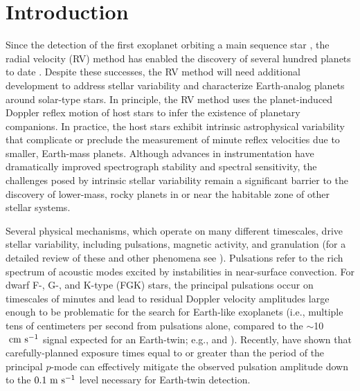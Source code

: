 \documentclass[twocolumn]{aastex63}
\newcommand{\ms}{{\rm m\ s}^{-1}}
\newcommand{\cms}{\ {\rm cm\ s}^{-1}}
\newcommand{\revise}[1]{#1}
\begin{document}

\section{Introduction} \label{intro}
Since the detection of the first exoplanet orbiting a main sequence star \citep{Mayor1995}, the radial velocity (RV) method has enabled the discovery of several hundred planets to date \citep[see the NASA Exoplanet Archive;][]{Akeson2017}. Despite these successes, the RV method will \revise{need additional development to address stellar variability} and characterize Earth-analog planets around solar-type stars. In principle, the RV method uses the planet-induced Doppler reflex motion of host stars to infer the existence of planetary companions. In practice, the host stars exhibit intrinsic astrophysical variability that complicate or preclude the measurement of minute reflex velocities due to smaller, Earth-mass planets. Although advances in instrumentation have dramatically improved spectrograph stability and spectral sensitivity, the challenges posed by intrinsic stellar variability remain a significant barrier to the discovery of lower-mass, rocky planets \revise{in or near the habitable zone of other stellar systems.} \par

Several physical mechanisms, which operate on many \revise{different} timescales, drive stellar variability, including pulsations, magnetic activity, and granulation \revise{(for a detailed review of these and other phenomena see \citealt{Meunier2021})}. Pulsations refer to the rich spectrum of acoustic modes excited by instabilities in near-surface convection. For dwarf F-, G-, and K-type (FGK) stars, the principal pulsations occur on timescales of minutes and lead to residual Doppler velocity amplitudes large enough to be problematic for the search for Earth-like exoplanets (i.e., \revise{multiple} tens of centimeters per second \revise{from pulsations alone, compared to the $\sim$10$\cms$ signal expected for an Earth-twin}; e.g., \citealt{O'Toole2008} and \citealt{Michel2008}). Recently, \citet{Chaplin2019} have shown that carefully-planned exposure times equal to or greater than the period of the principal $p$-mode can effectively mitigate the observed pulsation amplitude down to the $0.1\ \ms$ level necessary for Earth-twin detection. \par
\end{document}
